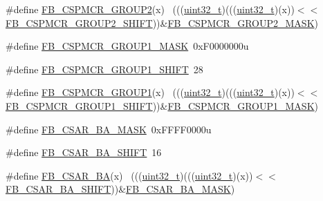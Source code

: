 \begin{DoxyCompactItemize}
\item 
\#define \hyperlink{group___f_b___register___masks_ga28e850f531a9d3b6c9415983a5f5727f}{F\+B\+\_\+\+C\+S\+P\+M\+C\+R\+\_\+\+G\+R\+O\+U\+P2}(x)                                        ~(((\hyperlink{_p_e___types_8h_a33594304e786b158f3fb30289278f5af}{uint32\+\_\+t})(((\hyperlink{_p_e___types_8h_a33594304e786b158f3fb30289278f5af}{uint32\+\_\+t})(x))$<$$<$\hyperlink{group___f_b___register___masks_ga332a2c4e7103b2f21af54da036518928}{F\+B\+\_\+\+C\+S\+P\+M\+C\+R\+\_\+\+G\+R\+O\+U\+P2\+\_\+\+S\+H\+I\+FT}))\&\hyperlink{group___f_b___register___masks_ga594596b281baba23e03cb37fbf0a05db}{F\+B\+\_\+\+C\+S\+P\+M\+C\+R\+\_\+\+G\+R\+O\+U\+P2\+\_\+\+M\+A\+SK})
\item 
\#define \hyperlink{group___f_b___register___masks_ga735fd2a0040e9ad1122a3c3fc8e28193}{F\+B\+\_\+\+C\+S\+P\+M\+C\+R\+\_\+\+G\+R\+O\+U\+P1\+\_\+\+M\+A\+SK}~0x\+F0000000u
\item 
\#define \hyperlink{group___f_b___register___masks_ga9c83850dcb3efe92a0404101e5afbdca}{F\+B\+\_\+\+C\+S\+P\+M\+C\+R\+\_\+\+G\+R\+O\+U\+P1\+\_\+\+S\+H\+I\+FT}~28
\item 
\#define \hyperlink{group___f_b___register___masks_ga9a5a66bff196c0cdfac5a0b293e5ca6a}{F\+B\+\_\+\+C\+S\+P\+M\+C\+R\+\_\+\+G\+R\+O\+U\+P1}(x)                                        ~(((\hyperlink{_p_e___types_8h_a33594304e786b158f3fb30289278f5af}{uint32\+\_\+t})(((\hyperlink{_p_e___types_8h_a33594304e786b158f3fb30289278f5af}{uint32\+\_\+t})(x))$<$$<$\hyperlink{group___f_b___register___masks_ga9c83850dcb3efe92a0404101e5afbdca}{F\+B\+\_\+\+C\+S\+P\+M\+C\+R\+\_\+\+G\+R\+O\+U\+P1\+\_\+\+S\+H\+I\+FT}))\&\hyperlink{group___f_b___register___masks_ga735fd2a0040e9ad1122a3c3fc8e28193}{F\+B\+\_\+\+C\+S\+P\+M\+C\+R\+\_\+\+G\+R\+O\+U\+P1\+\_\+\+M\+A\+SK})
\item 
\#define \hyperlink{group___f_b___register___masks_ga917335c957f6472faf91ae0b244db487}{F\+B\+\_\+\+C\+S\+A\+R\+\_\+\+B\+A\+\_\+\+M\+A\+SK}~0x\+F\+F\+F\+F0000u
\item 
\#define \hyperlink{group___f_b___register___masks_ga098f6109a1dcc8cc007bca53c312810f}{F\+B\+\_\+\+C\+S\+A\+R\+\_\+\+B\+A\+\_\+\+S\+H\+I\+FT}~16
\item 
\#define \hyperlink{group___f_b___register___masks_ga4241bb44a894dd2be2480feaf7eb2e21}{F\+B\+\_\+\+C\+S\+A\+R\+\_\+\+BA}(x)                                                    ~(((\hyperlink{_p_e___types_8h_a33594304e786b158f3fb30289278f5af}{uint32\+\_\+t})(((\hyperlink{_p_e___types_8h_a33594304e786b158f3fb30289278f5af}{uint32\+\_\+t})(x))$<$$<$\hyperlink{group___f_b___register___masks_ga098f6109a1dcc8cc007bca53c312810f}{F\+B\+\_\+\+C\+S\+A\+R\+\_\+\+B\+A\+\_\+\+S\+H\+I\+FT}))\&\hyperlink{group___f_b___register___masks_ga917335c957f6472faf91ae0b244db487}{F\+B\+\_\+\+C\+S\+A\+R\+\_\+\+B\+A\+\_\+\+M\+A\+SK})
$$
\end{DoxyCompactItemize}
